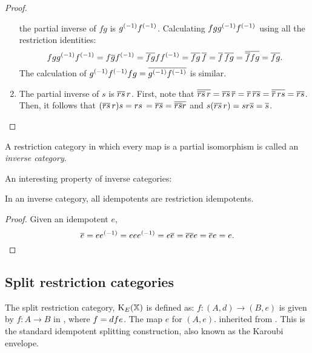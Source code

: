 \begin{proof}
\begin{enumerate}[{(}i{)}]
      the partial inverse of $f g$ is ${g}^{(-1)} {f}^{(-1)}$. Calculating $f g {g}^{(-1)} {f}^{(-1)}$
      using all the restriction identities:
      \[
        f g {g}^{(-1)} {f}^{(-1)} = f \overline{g} {f}^{(-1)} = \overline{f g} f {f}^{(-1)} =
        \overline{f g}\, \overline{f} = \overline{f}\, \overline{f g} = \overline{\overline{f} f g} = \overline{f g}.
      \]
      The calculation of ${g}^{(-1)} {f}^{(-1)} f g = \overline{{g}^{(-1)} {f}^{(-1)}}$ is similar.
    \item The partial inverse of $s$ is $\overline{r s}\,r$. First, note
      that $\overline{\overline{r s}\,r}
      = \overline{r s}\,\overline{r}
      = \overline{r}\, \overline{r s}
      = \overline{\overline{r}\,r s}
      = \overline{r s}$.
      Then, it follows that $(\overline{r s}\,r) s
      = r s\,= \overline{r s}
      = \overline{\overline{r s}r} $ and
      $s (\restr{r s}\,r)
      = s r \restr{s} %
      = \restr{s}$.
  \end{enumerate}
\end{proof}


A restriction category in which every map is a partial
isomorphism is called an \emph{inverse category}.

An interesting property of inverse categories:

\begin{lemma}
  \label{lem:inverse_idempotents_are_restriction_idempotents}
  In an inverse category, all idempotents are restriction idempotents.
\end{lemma}
\begin{proof}
  Given an idempotent $e$,
  \[
    \overline{e} = e{e}^{(-1)} = e e {e}^{(-1)} = e \overline{e} = \overline{e e} e = \overline{e} e = e.
  \]
\end{proof}
\subsection{Split restriction categories} %
\label{sub:split_restriction_categories}

The split restriction category, $\text{K}_{E}(\mathbb{X})$  is defined as: 
  {$f:(A,d)\to(B,e)$ is given by $f:A\to B$ in \X, where $f = d\hspace{0.1pt} f e$.}
  {The map $e$ for $(A,e)$.}
  {inherited from \X.}
This is the standard idempotent splitting construction, also known as the Karoubi
envelope.

